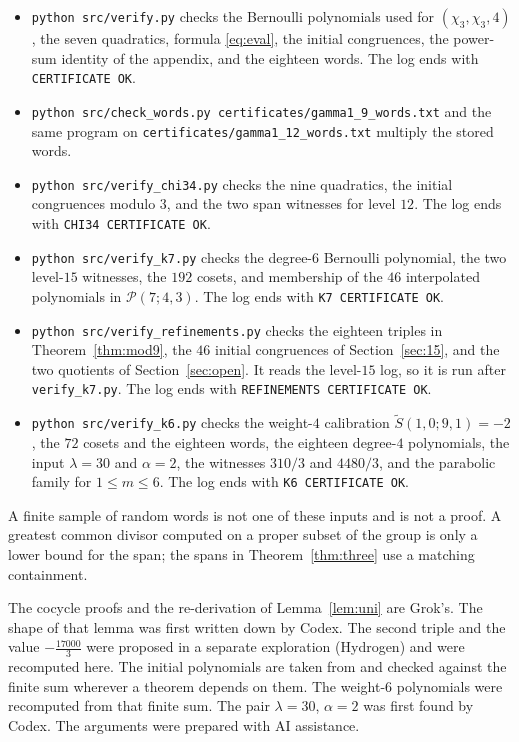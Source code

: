 \documentclass[11pt]{article}
\theoremstyle{remark}
\newcommand{\tS}{\widetilde{S}}
\begin{document}
\begin{itemize}
\item \texttt{python src/verify.py} checks the Bernoulli polynomials used for \((\chi_3,\chi_3,4)\), the seven quadratics, formula \eqref{eq:eval}, the initial congruences, the power-sum identity of the appendix, and the eighteen words.
The log ends with \texttt{CERTIFICATE OK}.
\item \texttt{python src/check\_words.py certificates/gamma1\_9\_words.txt} and the same program on \texttt{certificates/gamma1\_12\_words.txt} multiply the stored words.
\item \texttt{python src/verify\_chi34.py} checks the nine quadratics, the initial congruences modulo \(3\), and the two span witnesses for level \(12\).
The log ends with \texttt{CHI34 CERTIFICATE OK}.
\item \texttt{python src/verify\_k7.py} checks the degree-\(6\) Bernoulli polynomial, the two level-\(15\) witnesses, the \(192\) cosets, and membership of the \(46\) interpolated polynomials in \(\mathcal{P}(7;4,3)\).
The log ends with \texttt{K7 CERTIFICATE OK}.
\item \texttt{python src/verify\_refinements.py} checks the eighteen triples in Theorem~\ref{thm:mod9}, the \(46\) initial congruences of Section~\ref{sec:15}, and the two quotients of Section~\ref{sec:open}.
It reads the level-\(15\) log, so it is run after \texttt{verify\_k7.py}.
The log ends with \texttt{REFINEMENTS CERTIFICATE OK}.
\item \texttt{python src/verify\_k6.py} checks the weight-\(4\) calibration \(\tS(1,0;9,1)=-2\), the \(72\) cosets and the eighteen words, the eighteen degree-\(4\) polynomials, the input \(\lambda=30\) and \(\alpha=2\), the witnesses \(310/3\) and \(4480/3\), and the parabolic family for \(1\le m\le 6\).
The log ends with \texttt{K6 CERTIFICATE OK}.
\end{itemize}

A finite sample of random words is not one of these inputs and is not a proof.
A greatest common divisor computed on a proper subset of the group is only a lower bound for the span; the spans in Theorem~\ref{thm:three} use a matching containment.

The cocycle proofs and the re-derivation of Lemma~\ref{lem:uni} are Grok's.
The shape of that lemma was first written down by Codex.
The second triple and the value \(-\tfrac{17000}{3}\) were proposed in a separate exploration (Hydrogen) and were recomputed here.
The initial polynomials are taken from \cite{NFDS} and checked against the finite sum wherever a theorem depends on them.
The weight-\(6\) polynomials were recomputed from that finite sum.
The pair \(\lambda=30\), \(\alpha=2\) was first found by Codex.
The arguments were prepared with AI assistance.
\end{document}
